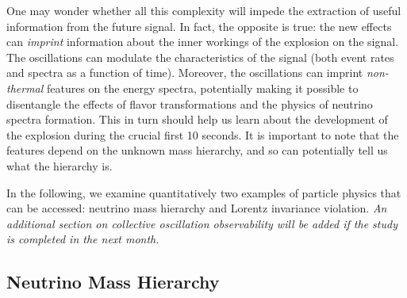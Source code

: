 One may wonder whether all this complexity will impede the extraction
of useful information from the future signal. In fact, the opposite is
true: the new effects can \emph{imprint} information about the inner
workings of the explosion on the signal. The oscillations can modulate
the characteristics of the signal (both event rates and spectra as a
function of time).
Moreover, the oscillations can imprint \emph{non-thermal} features on the energy spectra, potentially making it possible to disentangle the effects of flavor transformations and the physics of neutrino spectra formation. This in turn should help us learn about the development of the explosion during the crucial first 10 seconds.   It is important to note that the features depend on the unknown mass hierarchy, and so can potentially tell us what the hierarchy is.


In the following, we examine quantitatively two examples of particle
physics that can be accessed: neutrino mass hierarchy and Lorentz
invariance violation. \textit{An additional section on collective
  oscillation observability will be added if the study is completed in
  the next month.}


\subsection{Neutrino Mass Hierarchy}\label{sec:mh}


